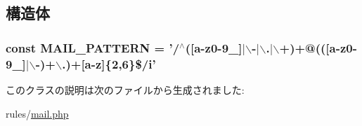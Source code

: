\subsection{構造体}
\hypertarget{class_rule_mail_ae120b9206d39e1922b268a74697c4775}{
\subsubsection[{\-M\-A\-I\-L\-\_\-\-P\-A\-T\-T\-E\-R\-N}]{\setlength{\rightskip}{0pt plus 5cm}const {\bf \-M\-A\-I\-L\-\_\-\-P\-A\-T\-T\-E\-R\-N} = '/$^\wedge$(\mbox{[}a-\/z0-\/9\-\_\-\mbox{]}$|$$\backslash$-\/$|$$\backslash$.$|$$\backslash$+)+@((\mbox{[}a-\/z0-\/9\-\_\-\mbox{]}$|$$\backslash$-\/)+$\backslash$.)+\mbox{[}a-\/z\mbox{]}\{2,6\}\$/i'}}
\label{class_rule_mail_ae120b9206d39e1922b268a74697c4775}


このクラスの説明は次のファイルから生成されました\-:\begin{DoxyCompactItemize}
\item 
rules/\hyperlink{mail_8php}{mail.\-php}\end{DoxyCompactItemize}
